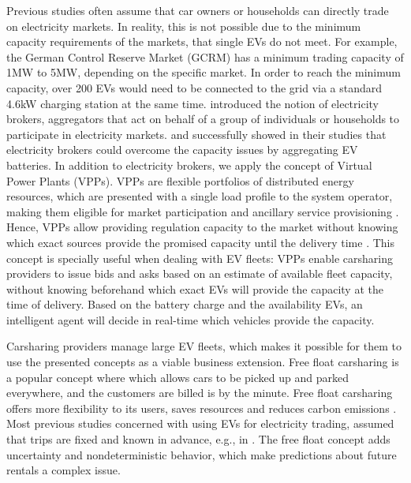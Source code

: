 \documentclass[12pt, article]{article}
\begin{document}
Previous studies often assume that car owners or households can directly trade
on electricity markets. In reality, this is not possible due to the minimum
capacity requirements of the markets, that single EVs do not meet. For example,
the German Control Reserve Market (GCRM) has a minimum trading capacity of 1MW
to 5MW, depending on the specific market. In order to reach the minimum
capacity, over 200 EVs would need to be connected to the grid via a standard
4.6kW charging station at the same time. \textcite{ketter13_power_tac} introduced
the notion of electricity brokers, aggregators that act on behalf of a group of
individuals or households to participate in electricity markets.
\textcite{brandt17_evaluat_busin_model_vehic_grid_integ} and
\textcite{kahlen14_balan_with_elect_vehic} successfully showed in their studies
that electricity brokers could overcome the capacity issues by aggregating EV
batteries. In addition to electricity brokers, we apply the concept of Virtual
Power Plants (VPPs). VPPs are flexible portfolios of distributed energy
resources, which are presented with a single load profile to the system
operator, making them eligible for market participation and ancillary service
provisioning \parencite{pudjianto07_virtual_power_plant_system_integ}. Hence, VPPs
allow providing regulation capacity to the market without knowing which exact
sources provide the promised capacity until the delivery time
\parencite{kahlen17_fleet}. This concept is specially useful when dealing with EV
fleets: VPPs enable carsharing providers to issue bids and asks based on an
estimate of available fleet capacity, without knowing beforehand which exact EVs
will provide the capacity at the time of delivery. Based on the battery charge
and the availability EVs, an intelligent agent will decide in real-time which
vehicles provide the capacity.

Carsharing providers manage large EV fleets, which makes it possible for them to
use the presented concepts as a viable business extension. Free float carsharing
is a popular concept where which allows cars to be picked up and parked
everywhere, and the customers are billed is by the minute. Free float carsharing
offers more flexibility to its users, saves resources and reduces carbon
emissions \parencite{firnkorn15_free_float_elect_carsh_fleet_smart_cities}. Most
previous studies concerned with using EVs for electricity trading, assumed that
trips are fixed and known in advance, e.g., in
\textcite{tomic07_using_fleet_elect_drive_vehic_grid_suppor}. The free float
concept adds uncertainty and nondeterministic behavior, which make predictions
about future rentals a complex issue.
\end{document}
